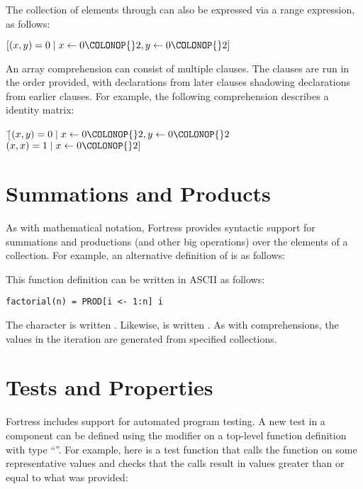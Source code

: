 The collection of elements  through  can also be expressed via a range expression, as follows:
\begin{Fortress}
\([(x,y) = 0 \mid x \leftarrow 0\COLONOP{}2, y \leftarrow 0\COLONOP{}2]\)
\end{Fortress}

An array comprehension can consist of multiple clauses. The clauses are run in the order provided,
with declarations from later clauses shadowing declarations from earlier clauses. For example, the following
comprehension describes a  identity matrix:

\begin{Fortress}
\(\ [ \)\pushtabs\=\+\((x,y) = 0 \mid x \leftarrow 0\COLONOP{}2, y \leftarrow 0\COLONOP{}2\)\\
\( (x,x) = 1 \mid x \leftarrow 0\COLONOP{}2]\)\-\\\poptabs
\end{Fortress}



\section{Summations and Products}
As with mathematical notation, Fortress provides syntactic support for
summations and productions (and other big operations) over the elements of a collection.
For example, an alternative definition of  is as follows:



This function definition can be written in ASCII as follows:

\begin{verbatim}
factorial(n) = PROD[i <- 1:n] i
\end{verbatim}

The character \EXP{\prod} is written .  Likewise,
\EXP{\sum} is written .
As with comprehensions, the values in the iteration are generated from specified collections.

\label{overviewTest}
\section{Tests and Properties}
Fortress includes support for automated program testing.
A new test in a component can be defined using the  modifier
on a top-level function definition with type ``\EXP{()\rightarrow()}''.
For example, here is a test function that calls the 
function on some representative values
and checks that the calls result in values greater than or equal to what was provided:


